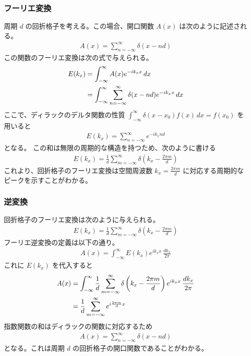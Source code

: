\documentclass[a4paper,11pt]{jsarticle}
\begin{document}
\subsubsection{フーリエ変換}
周期 \(d\) の回折格子を考える。この場合、開口関数 \(A(x)\) は次のように記述される。
\begin{align}
    A(x) = \sum_{n=-\infty}^\infty \delta(x - n d)
\end{align}
この関数のフーリエ変換は次の式で与えられる。
\begin{align}
    E(k_x) &= \int_{-\infty}^\infty A(x) e^{-i k_x x} \, dx \notag \\
           &= \int_{-\infty}^\infty \sum_{n=-\infty}^\infty \delta(x - n d) e^{-i k_x x} \, dx
\end{align}
ここで、ディラックのデルタ関数の性質 \(\int_{-\infty}^\infty \delta(x - x_0) f(x) \, dx = f(x_0)\) を用いると
\begin{align}
    E(k_x) = \sum_{n=-\infty}^\infty e^{-i k_x n d}
\end{align}
となる。
この和は無限の周期的な構造を持つため、次のように書ける
\begin{align}
    E(k_x) = \frac{1}{d} \sum_{m=-\infty}^\infty \delta\left(k_x - \frac{2\pi m}{d}\right)
\end{align}
これより、回折格子のフーリエ変換は空間周波数 \(k_x = \frac{2\pi m}{d}\) に対応する周期的なピークを示すことがわかる。

\subsubsection{逆変換}
回折格子のフーリエ変換は次のように与えられる。
\begin{align}
    E(k_x) = \frac{1}{d} \sum_{m=-\infty}^\infty \delta\left(k_x - \frac{2\pi m}{d}\right)
\end{align}
フーリエ逆変換の定義は以下の通り。
\begin{align}
    A(x) = \int_{-\infty}^\infty E(k_x) e^{i k_x x} \, \frac{dk_x}{2\pi}
\end{align}
これに \(E(k_x)\) を代入すると
\begin{align}
    A(x) &= \int_{-\infty}^\infty \frac{1}{d} \sum_{m=-\infty}^\infty \delta\left(k_x - \frac{2\pi m}{d}\right) e^{i k_x x} \, \frac{dk_x}{2\pi} \notag \\
         &= \frac{1}{d} \sum_{m=-\infty}^\infty e^{i \frac{2\pi m}{d} x}
\end{align}
指数関数の和はディラックの関数に対応するため
\begin{align}
    A(x) = \sum_{n=-\infty}^\infty \delta(x - n d)
\end{align}
となる。これは周期 \(d\) の回折格子の開口関数であることがわかる。
\end{document}
